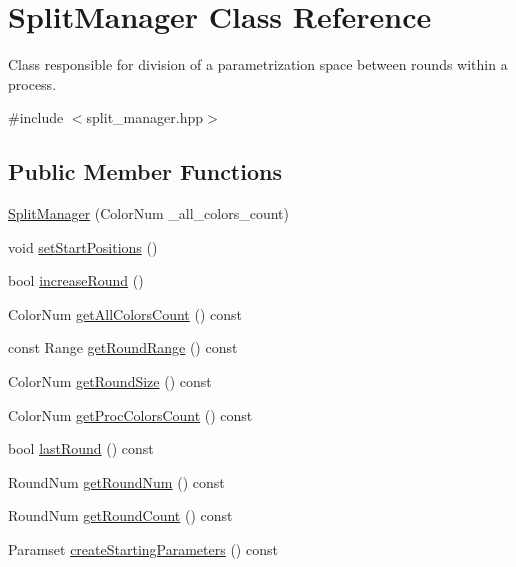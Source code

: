 \hypertarget{classSplitManager}{\section{\-Split\-Manager \-Class \-Reference}
\label{classSplitManager}
}


\-Class responsible for division of a parametrization space between rounds within a process.  




{\ttfamily \#include $<$split\-\_\-manager.\-hpp$>$}

\subsection*{\-Public \-Member \-Functions}
\begin{DoxyCompactItemize}
\item 
\hyperlink{classSplitManager_a43be4ad8687d41b4d5b39930f5647fd3}{\-Split\-Manager} (\-Color\-Num \-\_\-all\-\_\-colors\-\_\-count)
\item 
void \hyperlink{classSplitManager_aefbe08dc3d1ffc189c71b16ef9d29a2c}{set\-Start\-Positions} ()
\item 
bool \hyperlink{classSplitManager_a0721a815c598665f8543299d3bb26ef7}{increase\-Round} ()
\item 
\-Color\-Num \hyperlink{classSplitManager_a0714d6dfb287db3eebc20ca5d2437fa1}{get\-All\-Colors\-Count} () const 
\item 
const \-Range \hyperlink{classSplitManager_a22b8aa231bc5169b2239427fd6a65a50}{get\-Round\-Range} () const 
\item 
\-Color\-Num \hyperlink{classSplitManager_a1977ec7112a659132e7eeb4799d6a689}{get\-Round\-Size} () const 
\item 
\-Color\-Num \hyperlink{classSplitManager_ab812ebaf8a1338feb15cc1f19c8b8cfa}{get\-Proc\-Colors\-Count} () const 
\item 
bool \hyperlink{classSplitManager_ac120908494b23e5feb1c09298b0014e5}{last\-Round} () const 
\item 
\-Round\-Num \hyperlink{classSplitManager_a153bdba9ca3a46dbc16c527bbd2bac77}{get\-Round\-Num} () const 
\item 
\-Round\-Num \hyperlink{classSplitManager_a706c4330501d39beb83cef8be16bd52b}{get\-Round\-Count} () const 
\item 
\-Paramset \hyperlink{classSplitManager_a80401b25812e3f8d2c236a7639e0f4c8}{create\-Starting\-Parameters} () const 
\end{DoxyCompactItemize}


